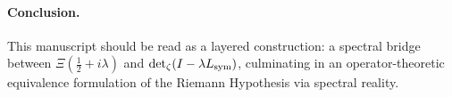 \paragraph*{Conclusion.}
This manuscript should be read as a layered construction: a spectral bridge between \( \Xi(\tfrac{1}{2} + i\lambda) \) and \( \det\nolimits_{\zeta}(I - \lambda L_{\mathrm{sym}}) \), culminating in an operator-theoretic equivalence formulation of the Riemann Hypothesis via spectral reality.
